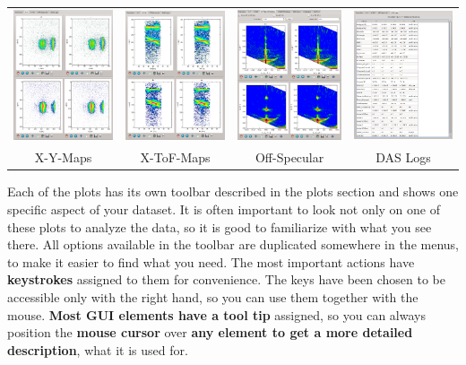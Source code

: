  \begin{tabular}{cccc}
 \includegraphics[width=103pt]{screenshots/xymaps.png}&
 \includegraphics[width=103pt]{screenshots/xtofmaps.png}&
 \includegraphics[width=103pt]{screenshots/offspecmaps.png}&
 \includegraphics[width=103pt]{screenshots/daslogs.png}\\
  X-Y-Maps & X-ToF-Maps & Off-Specular & DAS Logs
 \end{tabular}

 Each of the plots has its own toolbar described in the plots section and shows one specific aspect of your dataset. 
 It is often important to look not only on one of these plots to analyze the data, so it is good to familiarize with what you see there.
 All options available in the toolbar are duplicated somewhere in the menus, to make it easier to find what you need.
 The most important actions have \textbf{keystrokes} assigned to them for convenience. 
 The keys have been chosen to be accessible only with the right hand, so you can use them together with the mouse.
 \textbf{Most GUI elements have a tool tip} assigned, so you can always position the \textbf{mouse cursor} over \textbf{any element to get a more detailed description}, what it is used for.


